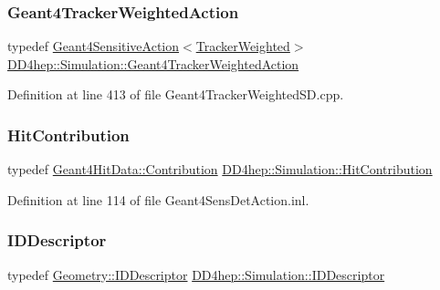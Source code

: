 \subsubsection{\texorpdfstring{Geant4\+Tracker\+Weighted\+Action}{Geant4TrackerWeightedAction}}
{\footnotesize\ttfamily typedef \hyperlink{class_d_d4hep_1_1_simulation_1_1_geant4_sensitive_action}{Geant4\+Sensitive\+Action}$<$\hyperlink{struct_d_d4hep_1_1_simulation_1_1_tracker_weighted}{Tracker\+Weighted}$>$ \hyperlink{namespace_d_d4hep_1_1_simulation_a63833833f53787d1116da0c3bb635dc8}{D\+D4hep\+::\+Simulation\+::\+Geant4\+Tracker\+Weighted\+Action}}



Definition at line 413 of file Geant4\+Tracker\+Weighted\+S\+D.\+cpp.

\hypertarget{namespace_d_d4hep_1_1_simulation_af3e4b03fc6b6e8a0ed0cba9dbf6c1f69}{}\label{namespace_d_d4hep_1_1_simulation_af3e4b03fc6b6e8a0ed0cba9dbf6c1f69} 
\subsubsection{\texorpdfstring{Hit\+Contribution}{HitContribution}}
{\footnotesize\ttfamily typedef \hyperlink{class_d_d4hep_1_1_simulation_1_1_geant4_hit_data_aec2f53237eac2db7d83dd03bca8719c5}{Geant4\+Hit\+Data\+::\+Contribution} \hyperlink{namespace_d_d4hep_1_1_simulation_af3e4b03fc6b6e8a0ed0cba9dbf6c1f69}{D\+D4hep\+::\+Simulation\+::\+Hit\+Contribution}}



Definition at line 114 of file Geant4\+Sens\+Det\+Action.\+inl.

\hypertarget{namespace_d_d4hep_1_1_simulation_a5f50c11f1a261ca45bb2e86ea6621083}{}\label{namespace_d_d4hep_1_1_simulation_a5f50c11f1a261ca45bb2e86ea6621083} 
\subsubsection{\texorpdfstring{I\+D\+Descriptor}{IDDescriptor}}
{\footnotesize\ttfamily typedef \hyperlink{class_d_d4hep_1_1_geometry_1_1_i_d_descriptor}{Geometry\+::\+I\+D\+Descriptor} \hyperlink{class_d_d4hep_1_1_geometry_1_1_i_d_descriptor}{D\+D4hep\+::\+Simulation\+::\+I\+D\+Descriptor}}



